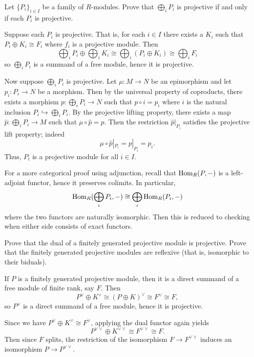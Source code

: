 \documentclass[../../master.tex]{subfiles}
\begin{document}
\begin{problem}
    Let $\{P_i\}_{i \in I}$ be a family of $R$-modules.
    Prove that $\bigoplus_i P_i$ is projective if and only if each $P_i$ is projective.
\end{problem}

\begin{solution}
    Suppose each $P_i$ is projective.
    That is, for each $i \in I$ there exists a $K_i$ such that $P_i \oplus K_i \cong F_i$ where $f_i$ is a projective module.
    Then
    \[
    \bigoplus_i P_i \oplus \bigoplus_i K_i \cong \bigoplus_i (P_i \oplus K_i) \cong \bigoplus_i F_i
    \]
    so $\bigoplus_i P_i$ is a summand of a free module, hence it is projective.

    Now suppose $\bigoplus_i P_i$ is projective.
    Let $\mu : M \to N$ be an epimorphism and let $p_i : P_i \to N$ be a morphism.
    Then by the universal property of coproducts, there exists a morphism $p : \bigoplus_i P_i \to N$ such that $p \circ i = p_i$ where $i$ is the natural inclusion $P_i \hookrightarrow \bigoplus_i P_i$.
    By the projective lifting property, there exists a map $\hat{p} : \bigoplus_i P_i \to M$ such that $\mu \circ \hat{p} = p$.
    Then the restriction $\hat{p}|_{P_i}$ satisfies the projective lift property;
    indeed
    \[
        \mu \circ \hat{p}|_{P_i} = p|_{P_i} = p_i.
    \]
    Thus, $P_i$ is a projective module for all $i \in I$.

    For a more categorical proof using adjunction, recall that $\operatorname{Hom}_R(P, -)$ is a left-adjoint functor, hence it preserves colimits.
    In particular,
    \[
    \operatorname{Hom}_R(\bigoplus_i P_i, -) \cong \bigoplus_i \operatorname{Hom}_R(P_i, -)
    \]
    where the two functors are naturally isomorphic.
    Then this is reduced to checking when either side consists of exact functors.
\end{solution}

\begin{problem}
    Prove that the dual of a finitely generated projective module is projective.
    Prove that the finitely generated projective modules are reflexive (that is, isomorphic to their biduals).
\end{problem}

\begin{solution}
    If $P$ is a finitely generated projective module, then it is a direct summand of a free module of finite rank, say $F$.
    Then
    \[
        P^{\vee} \oplus K^{\vee} \cong (P \oplus K)^{\vee} \cong F^{\vee} \cong F,
    \]
    so $P^{\vee}$ is a direct summand of a free module, hence it is projective.

    Since we have $P^{\vee} \oplus K^{\vee} \cong F^{\vee}$, applying the dual functor again yields
    \[
    P^{\vee \vee} \oplus K^{\vee \vee} \cong F^{\vee \vee} \cong F.
    \]
    Then since $F$ splits, the restriction of the isomorphism $F \to F^{\vee \vee}$ induces an isomorphism $P \to P^{\vee \vee}$.
\end{solution}
\end{document}
